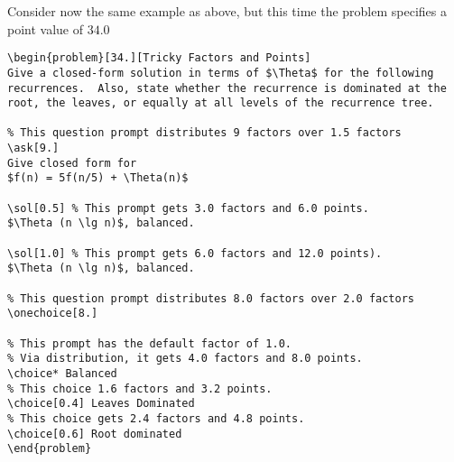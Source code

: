 \begin{cluster}
\label{grp:xmpl:quiz::consider}

\begin{example}
\label{xmpl:quiz::consider}
Consider now the same example as above, but this time
the problem specifies a point value of $34.0$

\begin{lstlisting}
\begin{problem}[34.][Tricky Factors and Points]
Give a closed-form solution in terms of $\Theta$ for the following
recurrences.  Also, state whether the recurrence is dominated at the
root, the leaves, or equally at all levels of the recurrence tree.

% This question prompt distributes 9 factors over 1.5 factors
\ask[9.]
Give closed form for  
$f(n) = 5f(n/5) + \Theta(n)$

\sol[0.5] % This prompt gets 3.0 factors and 6.0 points.
$\Theta (n \lg n)$, balanced.

\sol[1.0] % This prompt gets 6.0 factors and 12.0 points).
$\Theta (n \lg n)$, balanced.

% This question prompt distributes 8.0 factors over 2.0 factors 
\onechoice[8.] 

% This prompt has the default factor of 1.0.
% Via distribution, it gets 4.0 factors and 8.0 points. 
\choice* Balanced 
% This choice 1.6 factors and 3.2 points.
\choice[0.4] Leaves Dominated  
% This choice gets 2.4 factors and 4.8 points.
\choice[0.6] Root dominated   
\end{problem}
\end{lstlisting}

\end{example}
\end{cluster}

